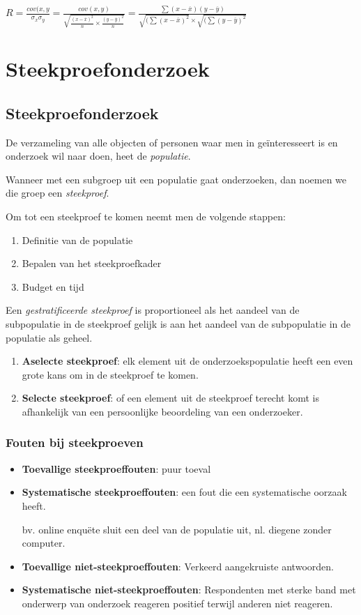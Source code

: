 \documentclass[a4paper,12pt]{article}
\begin{document}
$R= \frac{cov(x,y}{\sigma_x\sigma_y}
=
\frac
{cov(x,y)}
{\sqrt{\frac{(x-\overline{x})^2}{n}\times \frac{(y-\overline{y})^2}{n}}}=
\frac{\sum(x-\overline{x})(y-\overline{y})}
{\sqrt{(\sum (x-\overline{x})^2} \times \sqrt{(\sum (y-\overline{y})^2}}$

\section{Steekproefonderzoek}
\subsection{Steekproefonderzoek}
De verzameling van alle objecten of personen waar men in geïnteresseert is en onderzoek wil naar doen, heet de \textit{populatie}.

Wanneer met een subgroep uit een populatie gaat onderzoeken, dan noemen we die groep een \textit{steekproef}.

Om tot een steekproef te komen neemt men de volgende stappen:
\begin{enumerate}
\item Definitie van de populatie
\item Bepalen van het steekproefkader
\item Budget en tijd
\end{enumerate}

Een \textit{gestratificeerde steekproef} is proportioneel als het aandeel van de subpopulatie in de steekproef gelijk is aan het aandeel van de subpopulatie in de populatie als geheel.

\begin{enumerate}
\item \textbf{Aselecte steekproef}: elk element uit de onderzoekspopulatie heeft een even grote kans om in de steekproef te komen.
\item \textbf{Selecte steekproef}: of een element uit de steekproef terecht komt is afhankelijk van een persoonlijke beoordeling van een onderzoeker.
\end{enumerate}

\subsubsection{Fouten bij steekproeven}
\begin{itemize}
\item \textbf{Toevallige steekproeffouten}: puur toeval
\item \textbf{Systematische steekproeffouten}: een fout die een systematische oorzaak heeft.

bv. online enquëte sluit een deel van de populatie uit, nl. diegene zonder computer.

\item \textbf{Toevallige niet-steekproeffouten}: Verkeerd aangekruiste antwoorden.
\item \textbf{Systematische niet-steekproeffouten}: Respondenten met sterke band met onderwerp van onderzoek reageren positief terwijl anderen niet reageren.
\end{itemize}
\end{document}
